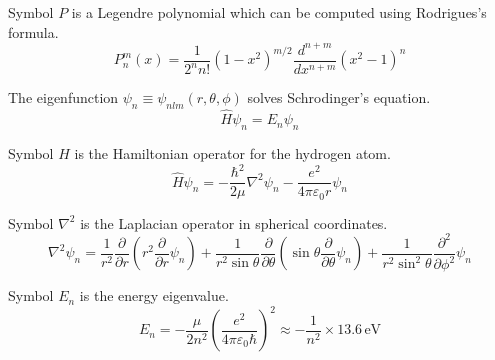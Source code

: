 \documentclass[12pt]{article}
\begin{document}
\noindent
Symbol $P$ is a Legendre polynomial which can be computed using Rodrigues's formula.
\begin{equation*}
P_n^m(x)=\frac{1}{2^n n!}(1-x^2)^{m/2}
\frac{d^{n+m}}{dx^{n+m}}(x^2-1)^n
\end{equation*}

\noindent
The eigenfunction $\psi_n\equiv\psi_{nlm}(r,\theta,\phi)$ solves Schrodinger's equation.
\begin{equation*}
\hat{H}\psi_n=E_n\psi_n
\end{equation*}

\noindent
Symbol $\hat{H}$ is the Hamiltonian operator for the hydrogen atom.
\begin{equation*}
\hat{H}\psi_n=-\frac{\hbar^2}{2\mu}\nabla^2\psi_n-\frac{e^2}{4\pi\varepsilon_0 r}\psi_n
\end{equation*}

\noindent
Symbol $\nabla^2$ is the Laplacian operator in spherical coordinates.
\begin{equation*}
\nabla^2\psi_n=\frac{1}{r^2}\frac{\partial}{\partial r}
\left(r^2\frac{\partial}{\partial r}\psi_n\right)
+
\frac{1}{r^2\sin\theta}\frac{\partial}{\partial\theta}
\left(\sin\theta\frac{\partial}{\partial\theta}\psi_n\right)
+
\frac{1}{r^2\sin^2\theta}\frac{\partial^2}{\partial\phi^2}\psi_n
\end{equation*}

\noindent
Symbol $E_n$ is the energy eigenvalue.
\begin{equation*}
E_n=-\frac{\mu}{2n^2}\left(\frac{e^2}{4\pi\varepsilon_0\hbar}\right)^2
\approx-\frac{1}{n^2}\times13.6\,\text{eV}
\end{equation*}
\end{document}
